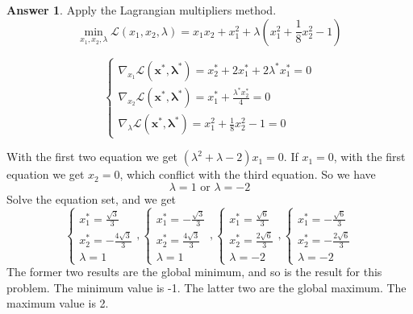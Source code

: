 \documentclass{article}
\theoremstyle{definition}
\newtheorem{ans}{Answer}
\begin{document}
	\begin{ans}
		Apply the Lagrangian multipliers method.
		$$
		\underset{x_1,x_2,\lambda}{\min}\mathcal{L}\left(x_1, x_2, \lambda\right)=x_1x_2+x_1^2+\lambda(x_{1}^{2}+\frac{1}{8} x_{2}^{2}-1)
		$$
		
		$$
		\left\{\begin{array}{l}
			\nabla_{x_1} \mathcal{L}\left(\boldsymbol{x}^*, \boldsymbol{\lambda}^*\right)=x_2^*+2x_1^*+2\lambda^*x_1^*=0 \\
			\nabla_{x_2} \mathcal{L}\left(\boldsymbol{x}^*, \boldsymbol{\lambda}^*\right)=x_1^*+\frac{\lambda^*x_2^*}{4}=0 \\
			\nabla_{\lambda} \mathcal{L}\left(\boldsymbol{x}^*, \boldsymbol{\lambda}^*\right)=x_{1}^{2}+\frac{1}{8} x_{2}^{2}-1=0
		\end{array}\right.
		$$
		
		With the first two equation we get $(\lambda^2+\lambda-2)x_1=0$. If $x_1=0$, with the first equation we get $x_2=0$, which conflict with the third equation. So we have
		$$
		\lambda=1\text{ or }\lambda=-2
		$$
		Solve the equation set, and we get 
		$$
		\left\{\begin{array}{l}
			x_1^*=\frac{\sqrt{3}}{3}\\
			x_2^*=-\frac{4\sqrt{3}}{3}\\
			\lambda=1
		\end{array}\right.,
		\left\{\begin{array}{l}
			x_1^*=-\frac{\sqrt{3}}{3}\\
			x_2^*=\frac{4\sqrt{3}}{3}\\
			\lambda=1
		\end{array}\right.,
		\left\{\begin{array}{l}
			x_1^*=\frac{\sqrt{6}}{3}\\
			x_2^*=\frac{2\sqrt{6}}{3}\\
			\lambda=-2
		\end{array}\right.,
		\left\{\begin{array}{l}
			x_1^*=-\frac{\sqrt{6}}{3}\\
			x_2^*=-\frac{2\sqrt{6}}{3}\\
			\lambda=-2
		\end{array}\right.
		$$
		The former two results are the global minimum, and so is the result for this problem. The minimum value is -1. The latter two are the global maximum. The maximum value is 2. 
	\end{ans}
	
\end{document}

